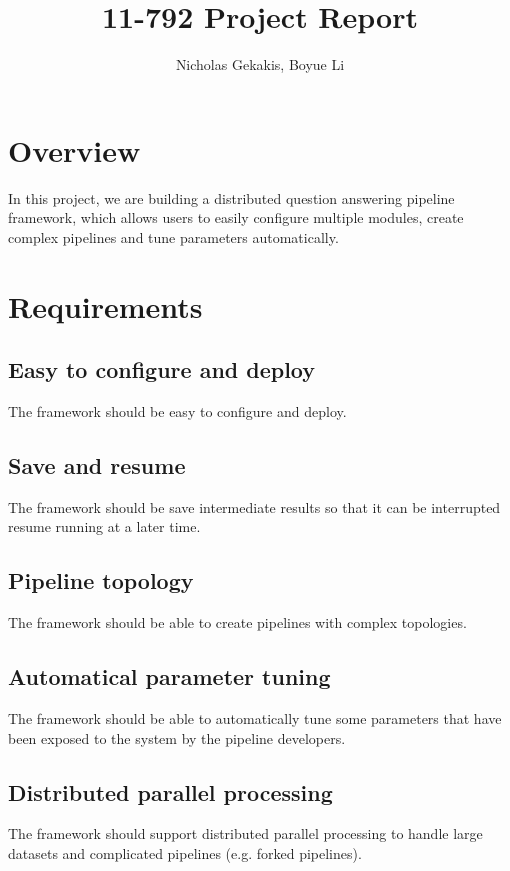 \documentclass{article}
\begin{document}
\title{11-792 Project Report}
 
\author{Nicholas Gekakis, Boyue Li}
 
\maketitle
 
\section{Overview}

In this project, we are building a distributed question answering pipeline framework,
which allows users to easily configure multiple modules,
create complex pipelines and tune parameters automatically.

\section{Requirements}

    \subsection{Easy to configure and deploy}
    The framework should be easy to configure and deploy.

    \subsection{Save and resume}
    The framework should be save intermediate results so that it can be interrupted resume running at a later time.

    \subsection{Pipeline topology}
    The framework should be able to create pipelines with complex topologies.

    \subsection{Automatical parameter tuning}
    The framework should be able to automatically tune some parameters that have been exposed to the system by the pipeline developers.

    \subsection{Distributed parallel processing}
    The framework should support distributed parallel processing to handle large datasets and complicated pipelines (e.g. forked pipelines).
\end{document}
